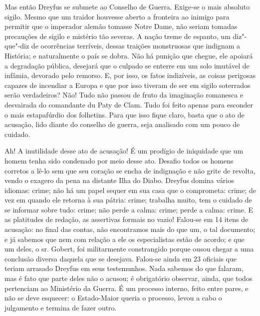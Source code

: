  Mas então Dreyfus se submete ao Conselho de Guerra. Exige-se o mais
absoluto sigilo. Mesmo que um traidor houvesse aberto a fronteira ao
inimigo para permitir que o imperador alemão tomasse Notre Dame, não
seriam tomadas precauções de sigilo e mistério tão severas. A nação
treme de espanto, um diz"-que"-diz de ocorrências terríveis, dessas
traições monstruosas que indignam a História; e naturalmente o país se
dobra. Não há punição que chegue, ele apoiará a degradação pública,
desejará que o culpado se enterre em um solo imutável de infâmia,
devorado pelo remorso. E, por isso, os fatos indizíveis, as coisas
perigosas capazes de incendiar a Europa e que por isso tiveram de ser
em sigilo soterrados serão verdadeiros? Não! Tudo não passou de fruto
da imaginação romanesca e desvairada do comandante du Paty de Clam. Tudo foi
feito apenas para esconder o mais estapafúrdio dos folhetins. Para que
isso fique claro, basta que o ato de acusação, lido diante do conselho
de guerra, seja analisado com um pouco de cuidado.

 Ah! A inutilidade desse ato de acusação! É um prodígio de iniquidade
que um homem tenha sido condenado por meio desse ato. Desafio todos os
homens corretos a lê-lo sem que seu coração se encha de indignação e
não grite de revolta, vendo o exagero da pena na distante Ilha do Diabo. 
Dreyfus domina vários idiomas: crime; não há um papel sequer em
sua casa que o comprometa: crime; de vez em quando ele retorna à sua
pátria: crime; trabalha muito, tem o cuidado de se informar sobre tudo:
crime; não perde a calma: crime; perde a calma: crime. E as
platitudes de redação, as assertivas formais no vazio! 
Falou-se em 14 itens de acusação: no final das contas, não encontramos mais
do que um, o tal documento; e já sabemos que nem com relação a ele os
especialistas estão de acordo; e que um deles, o sr. Gobert, foi
militarmente constrangido porque ousou chegar a uma conclusão diversa
daquela que se desejava. Falou-se ainda em 23 oficiais que
teriam arrasado Dreyfus em seus testemunhos. Nada sabemos do que
falaram, mas é fato que parte deles não o acusou; é obrigatório
observar, ainda, que todos pertenciam ao Ministério da Guerra. É um
processo interno, feito entre pares, e não se deve esquecer: 
o Estado-Maior queria o processo, levou a cabo o julgamento e termina de fazer outro.

